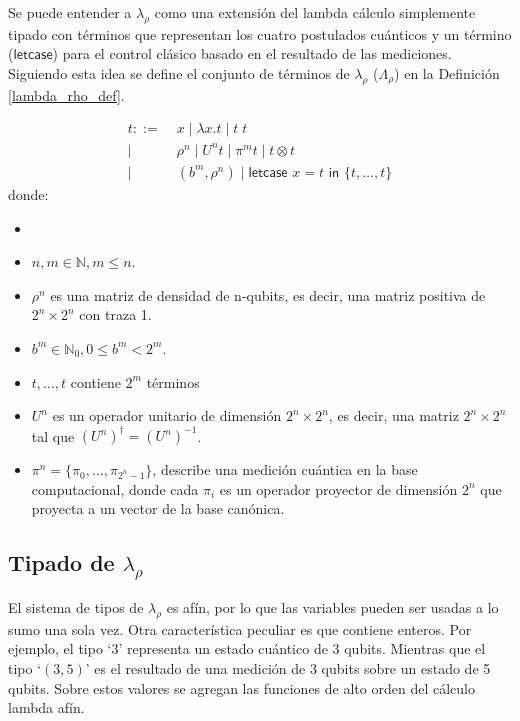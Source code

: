 Se puede entender a $\lambda_\rho$ como una extensión del lambda cálculo simplemente tipado con términos que representan los cuatro postulados cuánticos y un término ($\textsf{letcase}$) para el control clásico basado en el resultado de las mediciones. Siguiendo esta idea se define el conjunto de términos de $\lambda_\rho$ ($\Lambda_\rho$) en la Definición \ref{lambda_rho_def}.



\begin{definicion}
\label{lambda_rho_def}
\begin{align*}
t ::= &\;x \mid \lambda x.t \mid t\;t \tag{Lambda cálculo estándar}\\
 \mid&\; \rho^n \mid U^n t \mid \pi^m t \mid t \otimes t \tag{Postulados cuánticos}\\
 \mid&\; (b^m, \rho^n) \mid \textsf{letcase }x = t \textsf{ in } \{t,\dots,t\} \tag{Control clásico}
\end{align*}
donde:
\begin{itemize}
    \item
    \item $n,m \in \mathbb{N}, m \leq n$.
    \item $\rho^n$ es una matriz de densidad de n-qubits, es decir, una matriz positiva de $2^n \times 2^n$ con traza 1.
    \item $b^m \in \mathbb{N}_0, 0 \leq b^m < 2^m$.
    \item ${t,\dots,t}$ contiene $2^m$ términos
    \item $U^n$ es un operador unitario de dimensión $2^n \times 2^n$, es decir, una matriz $2^n \times 2^n$ tal que $(U^n)^\dagger = (U^n)^{-1}$.
    \item $\pi^n=\{\pi_0,\dots,\pi_{2^n-1}\}$, describe una medición cuántica en la base computacional, donde cada $\pi_i$ es un operador proyector de dimensión $2^n$ que proyecta a un vector de la base canónica.
\end{itemize}
\end{definicion}


\subsection{\texorpdfstring{Tipado de $\lambda_\rho$}{Tipado de Lambda Rho}}
El sistema de tipos de $\lambda_\rho$ es afín, por lo que las variables pueden ser usadas a lo sumo una sola vez. Otra característica peculiar es que contiene enteros. Por ejemplo, el tipo `3' representa un estado cuántico de 3 qubits. Mientras que el tipo `$(3, 5)$' es el resultado de una medición de 3 qubits sobre un estado de 5 qubits. Sobre estos valores se agregan las funciones de alto orden del cálculo lambda afín.

